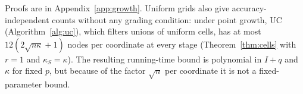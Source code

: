 Proofs are in Appendix~\ref{app:growth}. Uniform grids also give
accuracy-independent counts without any grading condition: under point
growth, UC (Algorithm~\ref{alg:uc}), which filters unions of uniform cells,
has at most $12(2\sqrt{n\kappa}+1)$ nodes per coordinate at every stage
(Theorem~\ref{thm:cells} with $r=1$ and $\kappa_S=\kappa$). The resulting
running-time bound is polynomial in $I+q$ and $\kappa$ for fixed $p$, but
because of the factor $\sqrt n$ per coordinate it is not a fixed-parameter
bound.
